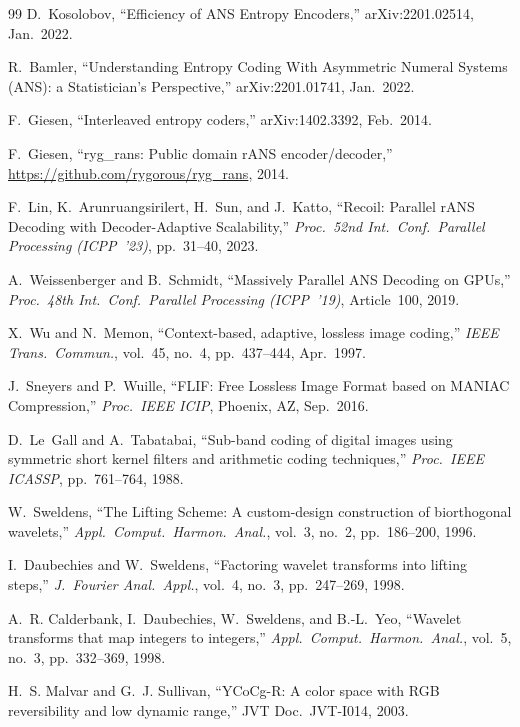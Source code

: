 \documentclass[10pt,twocolumn]{article}
\begin{document}
\begin{thebibliography}{99}
D.~Kosolobov, ``Efficiency of ANS Entropy Encoders,'' arXiv:2201.02514,
Jan.~2022.

R.~Bamler, ``Understanding Entropy Coding With Asymmetric Numeral Systems
(ANS): a Statistician's Perspective,'' arXiv:2201.01741, Jan.~2022.

F.~Giesen, ``Interleaved entropy coders,'' arXiv:1402.3392, Feb.~2014.

F.~Giesen, ``ryg\_rans: Public domain rANS encoder/decoder,''
\url{https://github.com/rygorous/ryg_rans}, 2014.

F.~Lin, K.~Arunruangsirilert, H.~Sun, and J.~Katto, ``Recoil: Parallel rANS
Decoding with Decoder-Adaptive Scalability,'' \textit{Proc.\ 52nd Int.\ Conf.\
Parallel Processing (ICPP~'23)}, pp.~31--40, 2023.

A.~Weissenberger and B.~Schmidt, ``Massively Parallel ANS Decoding on GPUs,''
\textit{Proc.\ 48th Int.\ Conf.\ Parallel Processing (ICPP~'19)}, Article~100,
2019.

X.~Wu and N.~Memon, ``Context-based, adaptive, lossless image coding,''
\textit{IEEE Trans.\ Commun.}, vol.~45, no.~4, pp.~437--444, Apr.~1997.

J.~Sneyers and P.~Wuille, ``FLIF: Free Lossless Image Format based on MANIAC
Compression,'' \textit{Proc.\ IEEE ICIP}, Phoenix, AZ, Sep.~2016.

D.~Le~Gall and A.~Tabatabai, ``Sub-band coding of digital images using
symmetric short kernel filters and arithmetic coding techniques,'' \textit{Proc.\
IEEE ICASSP}, pp.~761--764, 1988.

W.~Sweldens, ``The Lifting Scheme: A custom-design construction of biorthogonal
wavelets,'' \textit{Appl.\ Comput.\ Harmon.\ Anal.}, vol.~3, no.~2,
pp.~186--200, 1996.

I.~Daubechies and W.~Sweldens, ``Factoring wavelet transforms into lifting
steps,'' \textit{J.~Fourier Anal.\ Appl.}, vol.~4, no.~3, pp.~247--269, 1998.

\bibitem{calderbank1998}
A.~R. Calderbank, I.~Daubechies, W.~Sweldens, and B.-L.~Yeo, ``Wavelet
transforms that map integers to integers,'' \textit{Appl.\ Comput.\ Harmon.\
Anal.}, vol.~5, no.~3, pp.~332--369, 1998.

\bibitem{ycocgr}
H.~S. Malvar and G.~J. Sullivan, ``YCoCg-R: A color space with RGB
reversibility and low dynamic range,'' JVT Doc.\ JVT-I014, 2003.


\end{thebibliography}
\end{document}
